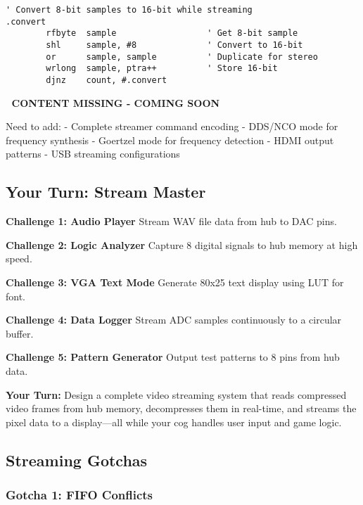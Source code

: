 \documentclass[11pt]{book}
\begin{document}
\begin{lstlisting}
' Convert 8-bit samples to 16-bit while streaming
.convert
        rfbyte  sample                  ' Get 8-bit sample
        shl     sample, #8              ' Convert to 16-bit
        or      sample, sample          ' Duplicate for stereo
        wrlong  sample, ptra++          ' Store 16-bit
        djnz    count, #.convert
\end{lstlisting}

\begin{missing}
🚧 \textbf{CONTENT MISSING - COMING SOON}

Need to add:
- Complete streamer command encoding
- DDS/NCO mode for frequency synthesis
- Goertzel mode for frequency detection
- HDMI output patterns
- USB streaming configurations
\end{missing}

\hypertarget{your-turn-stream-master}{%
\subsection{Your Turn: Stream Master}\label{your-turn-stream-master}}

\begin{yourturn}
\textbf{Challenge 1: Audio Player}
Stream WAV file data from hub to DAC pins.

\textbf{Challenge 2: Logic Analyzer}
Capture 8 digital signals to hub memory at high speed.

\textbf{Challenge 3: VGA Text Mode}
Generate 80x25 text display using LUT for font.

\textbf{Challenge 4: Data Logger}
Stream ADC samples continuously to a circular buffer.

\textbf{Challenge 5: Pattern Generator}
Output test patterns to 8 pins from hub data.
\end{yourturn}

\textbf{Your Turn:} Design a complete video streaming system that reads
compressed video frames from hub memory, decompresses them in real-time,
and streams the pixel data to a display---all while your cog handles
user input and game logic.

\hypertarget{streaming-gotchas}{%
\subsection{Streaming Gotchas}\label{streaming-gotchas}}

\hypertarget{gotcha-1-fifo-conflicts}{%
\subsubsection{Gotcha 1: FIFO Conflicts}\label{gotcha-1-fifo-conflicts}}
\end{document}

